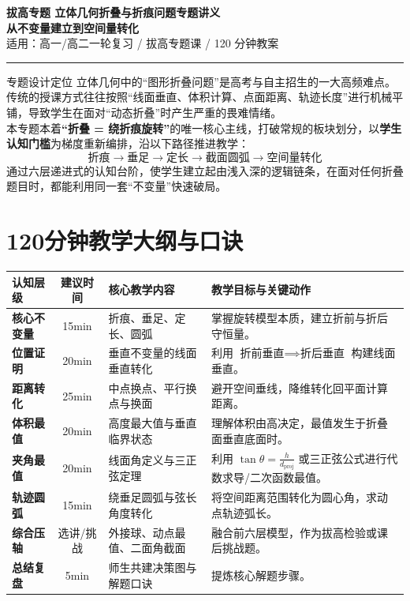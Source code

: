 \documentclass[11pt,a4paper]{ctexart}
\begin{document}
\begin{center}
  {\bfseries 拔高专题 \quad 立体几何折叠与折痕问题专题讲义}\\[3mm]
  {\Large \bfseries 从不变量建立到空间量转化}\\[2mm]
  {\large 适用：高一/高二一轮复习 / 拔高专题课 / 120 分钟教案}\\[2mm]
  \rule{0.85\linewidth}{0.5pt}
\end{center}

\begin{teachbox}{专题设计定位}
立体几何中的“图形折叠问题”是高考与自主招生的一大高频难点。传统的授课方式往往按照“线面垂直、体积计算、点面距离、轨迹长度”进行机械平铺，导致学生在面对“动态折叠”时产生严重的畏难情绪。\\
本专题本着\textbf{“折叠 = 绕折痕旋转”}的唯一核心主线，打破常规的板块划分，以\textbf{学生认知门槛}为梯度重新编排，沿以下路径推进教学：\\
$$\text{折痕} \rightarrow \text{垂足} \rightarrow \text{定长} \rightarrow \text{截面圆弧} \rightarrow \text{空间量转化}$$
通过六层递进式的认知台阶，使学生建立起由浅入深的逻辑链条，在面对任何折叠题目时，都能利用同一套“不变量”快速破局。
\end{teachbox}

\section{120分钟教学大纲与口诀}

\begin{center}
\renewcommand{\arraystretch}{1.2}
\begin{tabularx}{0.95\linewidth}{>{\bfseries}p{2.2cm} c p{4.5cm} X}
\toprule
认知层级 & 建议时间 & 核心教学内容 & 教学目标与关键动作 \\
\midrule
核心不变量 & 15min & 折痕、垂足、定长、圆弧 & 掌握旋转模型本质，建立折前与折后守恒量。 \\
位置证明 & 20min & 垂直不变量的线面垂直转化 & 利用 $\text{折前垂直} \implies \text{折后垂直}$ 构建线面垂直。 \\
距离转化 & 25min & 中点换点、平行换点与换面 & 避开空间垂线，降维转化回平面计算距离。 \\
体积最值 & 20min & 高度最大值与垂直临界状态 & 理解体积由高决定，最值发生于折叠面垂直底面时。 \\
夹角最值 & 20min & 线面角定义与三正弦定理 & 利用 $\tan\theta = \frac{h}{d_{\text{proj}}}$ 或三正弦公式进行代数求导/二次函数最值。 \\
轨迹圆弧 & 15min & 绕垂足圆弧与弦长角度转化 & 将空间距离范围转化为圆心角，求动点轨迹弧长。 \\
综合压轴 & 选讲/挑战 & 外接球、动点最值、二面角截面 & 融合前六层模型，作为拔高检验或课后挑战题。 \\
总结复盘 & 5min & 师生共建决策图与解题口诀 & 提炼核心解题步骤。 \\
\bottomrule
\end{tabularx}
\end{center}
\end{document}
